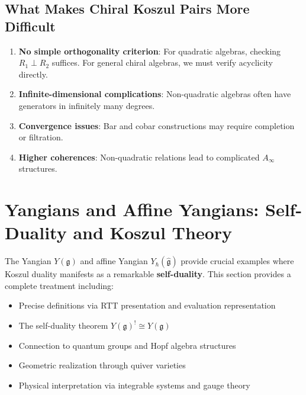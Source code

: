 \subsection{What Makes Chiral Koszul Pairs More Difficult}

\begin{enumerate}
\item \textbf{No simple orthogonality criterion}: For quadratic algebras, checking $R_1 \perp R_2$ suffices. For general chiral algebras, we must verify acyclicity directly.

\item \textbf{Infinite-dimensional complications}: Non-quadratic algebras often have generators in infinitely many degrees.

\item \textbf{Convergence issues}: Bar and cobar constructions may require completion or filtration.

\item \textbf{Higher coherences}: Non-quadratic relations lead to complicated $A_\infty$ structures.
\end{enumerate}


\section{Yangians and Affine Yangians: Self-Duality and Koszul Theory}
\label{sec:yangians-complete}

\begin{remark}
The Yangian $Y(\mathfrak{g})$ and affine Yangian $Y_{\hbar}(\widehat{\mathfrak{g}})$ 
provide crucial examples where Koszul duality manifests as a remarkable 
\textbf{self-duality}. This section provides a complete treatment including:
\begin{itemize}
\item Precise definitions via RTT presentation and evaluation representation
\item The self-duality theorem $Y(\mathfrak{g})^! \cong Y(\mathfrak{g})$
\item Connection to quantum groups and Hopf algebra structures
\item Geometric realization through quiver varieties
\item Physical interpretation via integrable systems and gauge theory
\end{itemize}
\end{remark}

